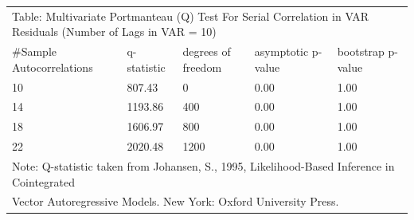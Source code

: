 \documentclass{article}
\begin{document}
 \begin{tabular}{lllll} 
 \multicolumn{5}{l}{Table: Multivariate Portmanteau (Q) Test For Serial 
     Correlation in VAR Residuals (Number of Lags in VAR = 10)} \\ 
 \#Sample Autocorrelations & q-statistic & degrees of freedom & asymptotic 
     p-value & bootstrap p-value \\ 
  10   & 807.43 &   0 & 0.00 & 1.00 \\  
  14   & 1193.86 & 400 & 0.00 & 1.00 \\  
  18   & 1606.97 & 800 & 0.00 & 1.00 \\  
  22   & 2020.48 & 1200 & 0.00 & 1.00 \\ 
 \multicolumn{5}{l}{Note: Q-statistic taken from Johansen, S., 1995, 
 Likelihood-Based Inference in Cointegrated } \\  
 \multicolumn{5}{l}{Vector Autoregressive Models. New York: Oxford University 
 Press.} 
   \end{tabular} 
\end{document}

